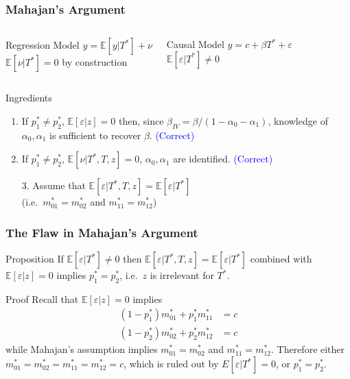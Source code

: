 \documentclass{beamer}
\begin{document}
\begin{frame}
  \frametitle{Mahajan's Argument}
    \begin{columns}[c]
    \begin{exampleblock}{Regression Model}
      $y = \mathbb{E}[y|T^*] + \nu$\\
      {\small $\mathbb{E}[\nu|T^*]=0$ by construction}
    \end{exampleblock}
    \begin{exampleblock}{Causal Model}
     $y = c + \beta T^* + \varepsilon$\\
     {\small$\mathbb{E}[\varepsilon|T^*]\neq 0$}
    \end{exampleblock}
    \end{columns}

    \vspace{0.7em}

    \begin{block}{Ingredients}
      
  \begin{enumerate}
    \item If $p^*_1 \neq p^*_2$, $\mathbb{E}[\varepsilon|z]=0$ then, since $\beta_{IV} = \beta/(1-\alpha_0-\alpha_1)$, knowledge of $\alpha_0,\alpha_1$ is sufficient to recover $\beta$. \textcolor{blue}{(Correct)}
    \item If $p^*_1 \neq p^*_2$, $\mathbb{E}[\nu|T^*,T,z]=0$, $\alpha_0, \alpha_1$ are identified. \textcolor{blue}{(Correct)}
    \item[] \alert{}
    \item[3.] Assume that $\mathbb{E}[\varepsilon|T^*,T,z]=\mathbb{E}[\varepsilon|T^*]$ \\ {\small (i.e.\ $m_{01}^* = m_{02}^*$ and $m_{11}^*=m_{12}^*$)}
  \end{enumerate}
    \end{block}
\end{frame}
\begin{frame}
  \frametitle{The Flaw in Mahajan's Argument}
  \begin{block}{Proposition}
    If $\mathbb{E}[\varepsilon|T^*]\neq 0$ then  $\mathbb{E}[\varepsilon|T^*,T,z]=\mathbb{E}[\varepsilon|T^*]$ combined with $\mathbb{E}[\varepsilon|z]=0$ implies $p^*_1 = p^*_2$, i.e.\ $z$ is irrelevant for $T^*$.
  \end{block}
  \begin{block}{Proof}
    Recall that $\mathbb{E}[\varepsilon|z]=0$ implies
  \begin{align*}
     (1-p_1^*) m^*_{01} + p^*_1 m^*_{11}&=c\\
     (1-p_2^*) m^*_{02} + p^*_2 m^*_{12}&=c
  \end{align*}
  while Mahajan's assumption implies $m_{01}^* = m_{02}^*$ and $m_{11}^*=m_{12}^*$.
  Therefore either $m_{01}^*=m_{02}^* = m_{11}^* =m_{12}^*=c$, which is ruled out by $E[\varepsilon|T^*]=0$, or $p^*_1 = p^*_2$.
  \end{block}
\end{frame}
\end{document}
